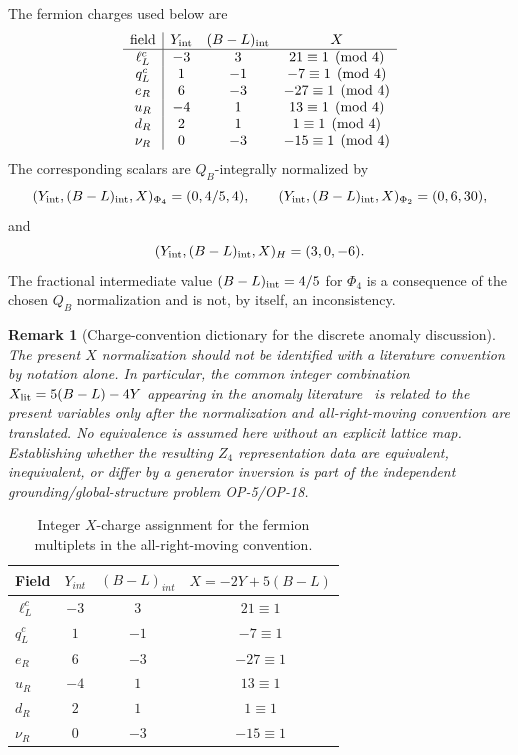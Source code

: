 \documentclass[11pt]{article}
\theoremstyle{canonmath}
\newtheorem{remark}[theorem]{Remark}
\theoremstyle{canonpostulate}
\theoremstyle{canonclaim}
\def\mathrm#1{#1}%
\def\mathbb#1{#1}%
\begin{document}
The fermion charges used below are
\begin{equation}
\begin{array}{c|ccc}
\text{field}&Y_{\rm int}&(B-L)_{\rm int}&X\\\hline
\ell_L^c&-3&3&21 \equiv 1 \pmod 4\\
q_L^c&1&-1&-7 \equiv 1 \pmod 4\\
e_R&6&-3&-27 \equiv 1 \pmod 4\\
u_R&-4&1&13 \equiv 1 \pmod 4\\
d_R&2&1&1 \equiv 1 \pmod 4\\
\nu_R&0&-3&-15 \equiv 1 \pmod 4
\end{array}
\end{equation}
The corresponding scalars are $Q_B$-integrally normalized by
\begin{equation}
(Y_{\rm int},(B-L)_{\rm int},X)_{\Phi_4}=(0,4/5,4),\qquad (Y_{\rm int},(B-L)_{\rm int},X)_{\Phi_2}=(0,6,30),
\end{equation}
and
\begin{equation}
(Y_{\rm int},(B-L)_{\rm int},X)_H=(3,0,-6).
\end{equation}
The fractional intermediate value $(B-L)_{\rm int}=4/5$ for $\Phi_4$ is a consequence of the chosen $Q_B$ normalization and is not, by itself, an inconsistency.

\begin{remark}[Charge-convention dictionary for the discrete anomaly discussion]
The present $X$ normalization should not be identified with a literature convention by notation alone. In particular, the common integer combination $X_{\rm lit}=5(B-L)-4Y$ appearing in the anomaly literature~\cite{Wang2020} is related to the present variables only after the normalization and all-right-moving convention are translated. No equivalence is assumed here without an explicit lattice map. Establishing whether the resulting $\mathbb Z_4$ representation data are equivalent, inequivalent, or differ by a generator inversion is part of the independent grounding/global-structure problem OP-5/OP-18.
\end{remark}

\begin{table}[H]
\centering
\caption{Integer $X$-charge assignment for the fermion multiplets in the all-right-moving convention.}
\label{tab:charges}
\begin{tabular}{@{}lccc@{}}
\toprule
\textbf{Field} & $Y_{\mathrm{int}}$ & $(B-L)_{\mathrm{int}}$ & $X=-2Y+5(B-L)$ \\
\midrule
$\ell_L^c$ & $-3$ & $3$ & $21 \equiv 1$ \\
$q_L^c$ & $1$ & $-1$ & $-7 \equiv 1$ \\
$e_R$ & $6$ & $-3$ & $-27 \equiv 1$ \\
$u_R$ & $-4$ & $1$ & $13 \equiv 1$ \\
$d_R$ & $2$ & $1$ & $1 \equiv 1$ \\
$\nu_R$ & $0$ & $-3$ & $-15 \equiv 1$ \\
\bottomrule
\end{tabular}
\end{table}
\end{document}

